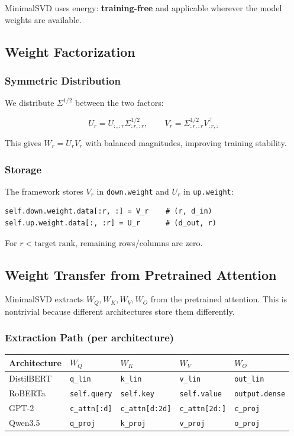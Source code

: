 MinimalSVD uses energy: \textbf{training-free} and applicable wherever the model 
weights are available.

\subsection{Weight Factorization}

\subsubsection{Symmetric Distribution}

We distribute $\Sigma^{1/2}$ between the two factors:

\[
U_r = U_{:, :r} \Sigma_{:r, :r}^{1/2}, \qquad
V_r = \Sigma_{:r, :r}^{1/2} V_{:r, :}^\top
\tag{4.6}
\]

This gives $W_r = U_r V_r$ with balanced magnitudes, improving training 
stability.

\subsubsection{Storage}

The framework stores $V_r$ in \texttt{down.weight} and $U_r$ in \texttt{up.weight}:

\begin{lstlisting}
self.down.weight.data[:r, :] = V_r    # (r, d_in)
self.up.weight.data[:, :r] = U_r      # (d_out, r)
\end{lstlisting}

For $r < \text{target rank}$, remaining rows/columns are zero.

\subsection{Weight Transfer from Pretrained Attention}

MinimalSVD extracts $W_Q, W_K, W_V, W_O$ from the pretrained attention. This 
is nontrivial because different architectures store them differently.

\subsubsection{Extraction Path (per architecture)}

\begin{table}[H]
\centering
\small
\begin{tabular}{lllll}
\toprule
\textbf{Architecture} & \textbf{$W_Q$} & \textbf{$W_K$} & \textbf{$W_V$} & \textbf{$W_O$} \\
\midrule
DistilBERT & \texttt{q\_lin} & \texttt{k\_lin} & \texttt{v\_lin} & \texttt{out\_lin} \\
RoBERTa & \texttt{self.query} & \texttt{self.key} & \texttt{self.value} & \texttt{output.dense} \\
GPT-2 & \texttt{c\_attn[:d]} & \texttt{c\_attn[d:2d]} & \texttt{c\_attn[2d:]} & \texttt{c\_proj} \\
Qwen3.5 & \texttt{q\_proj} & \texttt{k\_proj} & \texttt{v\_proj} & \texttt{o\_proj} \\
\bottomrule
\end{tabular}
\end{table}

